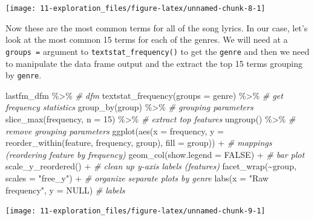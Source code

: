 \documentclass[
]{article}
\newenvironment{Shaded}{\begin{snugshade}}{\end{snugshade}}
\newcommand{\AttributeTok}[1]{\textcolor[rgb]{0.77,0.63,0.00}{#1}}
\newcommand{\CommentTok}[1]{\textcolor[rgb]{0.56,0.35,0.01}{\textit{#1}}}
\newcommand{\ConstantTok}[1]{\textcolor[rgb]{0.00,0.00,0.00}{#1}}
\newcommand{\DecValTok}[1]{\textcolor[rgb]{0.00,0.00,0.81}{#1}}
\newcommand{\FunctionTok}[1]{\textcolor[rgb]{0.00,0.00,0.00}{#1}}
\newcommand{\NormalTok}[1]{#1}
\newcommand{\SpecialCharTok}[1]{\textcolor[rgb]{0.00,0.00,0.00}{#1}}
\newcommand{\StringTok}[1]{\textcolor[rgb]{0.31,0.60,0.02}{#1}}
\begin{document}
\begin{center}\texttt{[image: 11-exploration\_files/figure-latex/unnamed-chunk-8-1]} \end{center}

Now these are the most common terms for all of the song lyrics. In our case, let's look at the most common 15 terms for each of the genres. We will need at a \texttt{groups\ =} argument to \texttt{textstat\_frequency()} to get the \texttt{genre} and then we need to manipulate the data frame output and the extract the top 15 terms grouping by \texttt{genre}.

\begin{Shaded}
\begin{Highlighting}[]
\NormalTok{lastfm\_dfm }\SpecialCharTok{\%\textgreater{}\%} \CommentTok{\# dfm}
  \FunctionTok{textstat\_frequency}\NormalTok{(}\AttributeTok{groups =}\NormalTok{ genre) }\SpecialCharTok{\%\textgreater{}\%} \CommentTok{\# get frequency statistics}
  \FunctionTok{group\_by}\NormalTok{(group) }\SpecialCharTok{\%\textgreater{}\%} \CommentTok{\# grouping parameters}
  \FunctionTok{slice\_max}\NormalTok{(frequency, }\AttributeTok{n =} \DecValTok{15}\NormalTok{) }\SpecialCharTok{\%\textgreater{}\%} \CommentTok{\# extract top features}
  \FunctionTok{ungroup}\NormalTok{() }\SpecialCharTok{\%\textgreater{}\%} \CommentTok{\# remove grouping parameters}
  \FunctionTok{ggplot}\NormalTok{(}\FunctionTok{aes}\NormalTok{(}\AttributeTok{x =}\NormalTok{ frequency, }\AttributeTok{y =} \FunctionTok{reorder\_within}\NormalTok{(feature, frequency, group), }\AttributeTok{fill =}\NormalTok{ group)) }\SpecialCharTok{+} \CommentTok{\# mappings (reordering feature by frequency)}
  \FunctionTok{geom\_col}\NormalTok{(}\AttributeTok{show.legend =} \ConstantTok{FALSE}\NormalTok{) }\SpecialCharTok{+} \CommentTok{\# bar plot}
  \FunctionTok{scale\_y\_reordered}\NormalTok{() }\SpecialCharTok{+} \CommentTok{\# clean up y{-}axis labels (features)}
  \FunctionTok{facet\_wrap}\NormalTok{(}\SpecialCharTok{\textasciitilde{}}\NormalTok{group, }\AttributeTok{scales =} \StringTok{"free\_y"}\NormalTok{) }\SpecialCharTok{+} \CommentTok{\# organize separate plots by genre}
  \FunctionTok{labs}\NormalTok{(}\AttributeTok{x =} \StringTok{"Raw frequency"}\NormalTok{, }\AttributeTok{y =} \ConstantTok{NULL}\NormalTok{) }\CommentTok{\# labels}
\end{Highlighting}
\end{Shaded}

\begin{center}\texttt{[image: 11-exploration\_files/figure-latex/unnamed-chunk-9-1]} \end{center}
\end{document}
